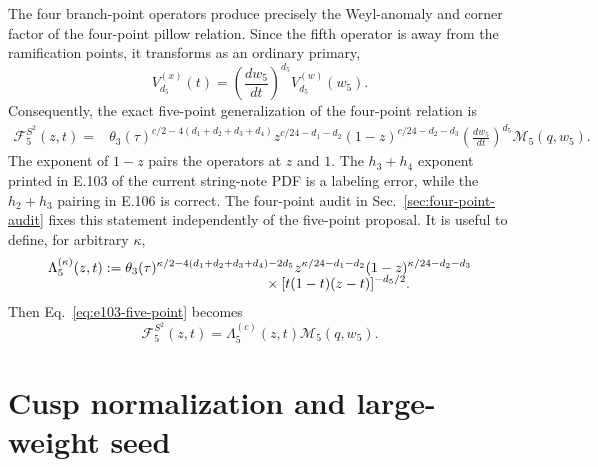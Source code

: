 \documentclass[11pt]{article}
\newcommand{\cF}{\mathcal F}
\newcommand{\cM}{\mathcal M}
\begin{document}
The four branch-point operators produce precisely the Weyl-anomaly and
corner factor of the four-point pillow relation.  Since the fifth operator
is away from the ramification points, it transforms as an ordinary primary,
\begin{equation}
 V_{d_5}^{(x)}(t)
 =\left(\frac{dw_5}{dt}\right)^{d_5}V_{d_5}^{(w)}(w_5).
 \label{eq:primary-transform}
\end{equation}
Consequently, the exact five-point generalization of the four-point
relation is
\begin{align}
 \cF^{S^2}_5(z,t)
 ={}&
 \theta_3(\tau)^{c/2-4(d_1+d_2+d_3+d_4)}
 z^{c/24-d_1-d_2}(1-z)^{c/24-d_2-d_3}
 \left(\frac{dw_5}{dt}\right)^{d_5}
 \cM_5(q,w_5).
 \label{eq:e103-five-point}
\end{align}
The exponent of $1-z$ pairs the operators at $z$ and $1$.  The
$h_3+h_4$ exponent printed in E.103 of the current string-note PDF is a
labeling error, while the $h_2+h_3$ pairing in E.106 is correct.  The
four-point audit in Sec.~\ref{sec:four-point-audit} fixes this statement
independently of the five-point proposal.
It is useful to define, for arbitrary $\kappa$,
\begin{align}
 \Lambda_5^{(\kappa)}(z,t)
 :={}&
 \theta_3(\tau)^{\kappa/2-4(d_1+d_2+d_3+d_4)-2d_5}
 z^{\kappa/24-d_1-d_2}(1-z)^{\kappa/24-d_2-d_3}
 \nonumber\\[-2mm]
 &\hspace{35mm}\times
 [t(1-t)(z-t)]^{-d_5/2}.
 \label{eq:lambda-five}
\end{align}
Then Eq.~\eqref{eq:e103-five-point} becomes
\begin{equation}
 \boxed{
 \cF^{S^2}_5(z,t)=\Lambda_5^{(c)}(z,t)\cM_5(q,w_5).}
 \label{eq:exact-factorization}
\end{equation}

\section{Cusp normalization and large-weight seed}
\end{document}
